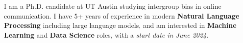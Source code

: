 I am a Ph.D. candidate at UT Austin studying intergroup bias in online communication. I have 5+ years of experience in modern \textbf{Natural Language Processing} including large language models, and am interested in  \textbf{Machine Learning} and \textbf{Data Science} roles, with a \emph{start date in June 2024}.

